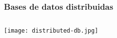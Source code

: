 \begin{frame}
    \frametitle{Bases de datos distribuidas}

    \begin{columns}
        \centering
        \texttt{[image: distributed-db.jpg]}

        \centering

        \huge

    \end{columns}

\end{frame}